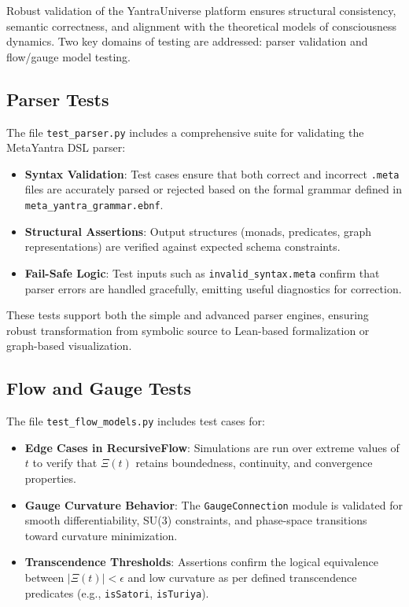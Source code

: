 \documentclass[12pt]{article}
\theoremstyle{plain}
\begin{document}
Robust validation of the YantraUniverse platform ensures structural consistency, semantic correctness, and alignment with the theoretical models of consciousness dynamics. Two key domains of testing are addressed: parser validation and flow/gauge model testing.

\subsection{Parser Tests}

The file \texttt{test\_parser.py} includes a comprehensive suite for validating the MetaYantra DSL parser:

\begin{itemize}
  \item \textbf{Syntax Validation}: Test cases ensure that both correct and incorrect \texttt{.meta} files are accurately parsed or rejected based on the formal grammar defined in \texttt{meta\_yantra\_grammar.ebnf}.
  \item \textbf{Structural Assertions}: Output structures (monads, predicates, graph representations) are verified against expected schema constraints.
  \item \textbf{Fail-Safe Logic}: Test inputs such as \texttt{invalid\_syntax.meta} confirm that parser errors are handled gracefully, emitting useful diagnostics for correction.
\end{itemize}

These tests support both the simple and advanced parser engines, ensuring robust transformation from symbolic source to Lean-based formalization or graph-based visualization.

\subsection{Flow and Gauge Tests}

The file \texttt{test\_flow\_models.py} includes test cases for:

\begin{itemize}
  \item \textbf{Edge Cases in RecursiveFlow}: Simulations are run over extreme values of $t$ to verify that $\Xi(t)$ retains boundedness, continuity, and convergence properties.
  \item \textbf{Gauge Curvature Behavior}: The \texttt{GaugeConnection} module is validated for smooth differentiability, SU(3) constraints, and phase-space transitions toward curvature minimization.
  \item \textbf{Transcendence Thresholds}: Assertions confirm the logical equivalence between $|\Xi(t)| < \epsilon$ and low curvature as per defined transcendence predicates (e.g., \texttt{isSatori}, \texttt{isTuriya}).
\end{itemize}
\end{document}
